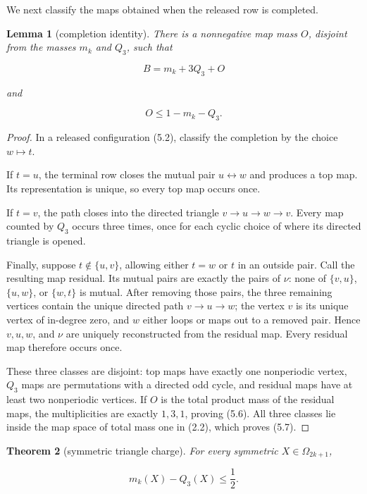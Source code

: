 \documentclass[11pt]{article}
\newtheorem{theorem}{Theorem}[section]
\newtheorem{lemma}[theorem]{Lemma}
\theoremstyle{remark}
\begin{document}
We next classify the maps obtained when the released row is completed.

\begin{lemma}[completion identity]
There is a nonnegative map mass $O$,
disjoint from the masses $m_k$ and $Q_3$, such that

\[
B=m_k+3Q_3+O
\tag{5.6}
\]

and

\[
O\le1-m_k-Q_3.
\tag{5.7}
\]

\end{lemma}

\begin{proof}
In a released configuration (5.2), classify the completion by the
choice $w\mapsto t$.

If $t=u$, the terminal row closes the mutual pair $u\leftrightarrow w$ and
produces a top map. Its representation is unique, so every top map occurs
once.

If $t=v$, the path closes into the directed triangle
$v\to u\to w\to v$. Every map counted by $Q_3$ occurs three times, once for
each cyclic choice of where its directed triangle is opened.

Finally, suppose $t\notin\{u,v\}$, allowing either $t=w$ or $t$ in an
outside pair. Call the resulting map residual. Its mutual pairs are exactly
the pairs of $\nu$: none of $\{v,u\}$, $\{u,w\}$, or $\{w,t\}$ is mutual.
After removing those pairs, the three remaining vertices contain the unique
directed path $v\to u\to w$; the vertex $v$ is its unique vertex of
in-degree zero, and $w$ either loops or maps out to a removed pair. Hence
$v,u,w$, and $\nu$ are uniquely reconstructed from the residual map. Every
residual map therefore occurs once.

These three classes are disjoint: top maps have exactly one nonperiodic
vertex, $Q_3$ maps are permutations with a directed odd cycle, and residual
maps have at least two nonperiodic vertices. If $O$ is the total product
mass of the residual maps, the multiplicities are exactly $1,3,1$, proving
(5.6). All three classes lie inside the map space of total mass one in
(2.2), which proves (5.7).
\end{proof}

\begin{theorem}[symmetric triangle charge]
For every symmetric
$X\in\Omega_{2k+1}$,

\[
m_k(X)-Q_3(X)\le\frac12.
\tag{5.8}
\]

\end{theorem}
\end{document}
